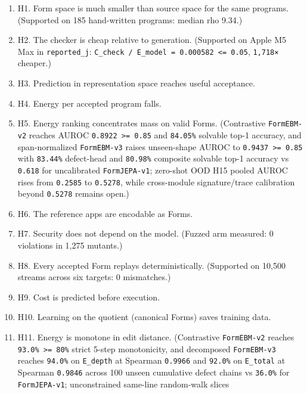 \documentclass[10pt,letterpaper]{article}
\providecommand{\tightlist}{\setlength{\itemsep}{1pt}\setlength{\parskip}{0pt}}
\begin{document}
\begin{enumerate}
\def\labelenumi{\arabic{enumi}.}
\tightlist
\item
  H1. Form space is much smaller than source space for the same
  programs. (Supported on 185 hand-written programs: median rho 9.34.)
\item
  H2. The checker is cheap relative to generation. (Supported on Apple
  M5 Max in \texttt{reported\_\allowbreak{}j}:
  \texttt{C\_check\ /\ E\_model\ =\ 0.000582\ \textless{}=\ 0.05},
  \texttt{1,718×} cheaper.)
\item
  H3. Prediction in representation space reaches useful acceptance.
\item
  H4. Energy per accepted program falls.
\item
  H5. Energy ranking concentrates mass on valid Forms. (Contrastive
  \texttt{FormEBM-\allowbreak{}v2} reaches AUROC
  \texttt{0.8922\ \textgreater{}=\ 0.85} and \texttt{84.05\%} solvable
  top-1 accuracy, and span-normalized \texttt{FormEBM-\allowbreak{}v3} raises
  unseen-shape AUROC to \texttt{0.9437\ \textgreater{}=\ 0.85} with
  \texttt{83.44\%} defect-head and \texttt{80.98\%} composite solvable
  top-1 accuracy vs \texttt{0.618} for uncalibrated
  \texttt{FormJEPA-\allowbreak{}v1}; zero-shot OOD H15 pooled AUROC rises from
  \texttt{0.2585} to \texttt{0.5278}, while cross-module signature/trace
  calibration beyond \texttt{0.5278} remains open.)
\item
  H6. The reference apps are encodable as Forms.
\item
  H7. Security does not depend on the model. (Fuzzed arm measured: 0
  violations in 1,275 mutants.)
\item
  H8. Every accepted Form replays deterministically. (Supported on
  10,500 streams across six targets: 0 mismatches.)
\item
  H9. Cost is predicted before execution.
\item
  H10. Learning on the quotient (canonical Forms) saves training data.
\item
  H11. Energy is monotone in edit distance. (Contrastive
  \texttt{FormEBM-\allowbreak{}v2} reaches \texttt{93.0\%\ \textgreater{}=\ 80\%}
  strict 5-step monotonicity, and decomposed \texttt{FormEBM-\allowbreak{}v3} reaches
  \texttt{94.0\%} on \texttt{E\_depth} at Spearman \texttt{0.9966} and
  \texttt{92.0\%} on \texttt{E\_total} at Spearman \texttt{0.9846}
  across 100 unseen cumulative defect chains vs \texttt{36.0\%} for
  \texttt{FormJEPA-\allowbreak{}v1}; unconstrained same-line random-walk slices

\end{enumerate}
\end{document}
